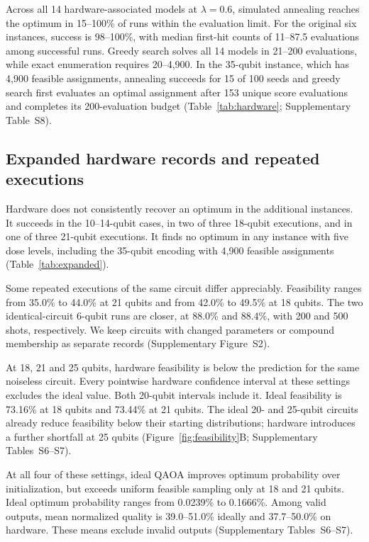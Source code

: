 \documentclass[utf8]{FrontiersinHarvard}
\begin{document}
Across all 14 hardware-associated models at $\lambda=0.6$, simulated annealing reaches the optimum in 15--100\% of runs within the evaluation limit. For the original six instances, success is 98--100\%, with median first-hit counts of 11--87.5 evaluations among successful runs. Greedy search solves all 14 models in 21--200 evaluations, while exact enumeration requires 20--4,900. In the 35-qubit instance, which has 4,900 feasible assignments, annealing succeeds for 15 of 100 seeds and greedy search first evaluates an optimal assignment after 153 unique score evaluations and completes its 200-evaluation budget (Table~\ref{tab:hardware}; Supplementary Table~S8).

\subsection{Expanded hardware records and repeated executions}
Hardware does not consistently recover an optimum in the additional instances. It succeeds in the 10--14-qubit cases, in two of three 18-qubit executions, and in one of three 21-qubit executions. It finds no optimum in any instance with five dose levels, including the 35-qubit encoding with 4,900 feasible assignments (Table~\ref{tab:expanded}).

Some repeated executions of the same circuit differ appreciably. Feasibility ranges from 35.0\% to 44.0\% at 21 qubits and from 42.0\% to 49.5\% at 18 qubits. The two identical-circuit 6-qubit runs are closer, at 88.0\% and 88.4\%, with 200 and 500 shots, respectively. We keep circuits with changed parameters or compound membership as separate records (Supplementary Figure~S2).

At 18, 21 and 25 qubits, hardware feasibility is below the prediction for the same noiseless circuit. Every pointwise hardware confidence interval at these settings excludes the ideal value. Both 20-qubit intervals include it. Ideal feasibility is 73.16\% at 18 qubits and 73.44\% at 21 qubits. The ideal 20- and 25-qubit circuits already reduce feasibility below their starting distributions; hardware introduces a further shortfall at 25 qubits (Figure~\ref{fig:feasibility}B; Supplementary Tables~S6--S7).

At all four of these settings, ideal QAOA improves optimum probability over initialization, but exceeds uniform feasible sampling only at 18 and 21 qubits. Ideal optimum probability ranges from 0.0239\% to 0.1666\%. Among valid outputs, mean normalized quality is 39.0--51.0\% ideally and 37.7--50.0\% on hardware. These means exclude invalid outputs (Supplementary Tables~S6--S7).
\end{document}
